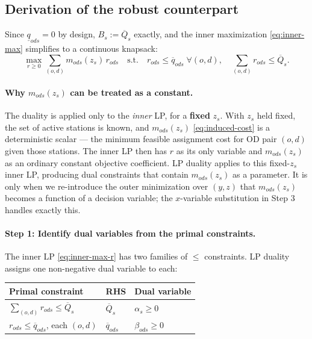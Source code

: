 \documentclass[11pt]{article}
\theoremstyle{definition}
\begin{document}
\subsection{Derivation of the robust counterpart}

Since $\underline{q}_{ods} = 0$ by design, $B_s := \overline{Q}_s$ exactly,
and the inner maximization \eqref{eq:inner-max} simplifies to a continuous
knapsack:
\begin{equation}
	\max_{r \ge 0}
	\sum_{(o,d)}
	m_{ods}(z_s)\, r_{ods}
	\quad
	\text{s.t.}\quad
	r_{ods} \le \overline{q}_{ods} \;\forall (o,d), \quad
	\sum_{(o,d)} r_{ods} \le \overline{Q}_s.
	\label{eq:inner-max-r}
\end{equation}

\paragraph{Why $m_{ods}(z_s)$ can be treated as a constant.}
The duality is applied only to the \emph{inner} LP, for a \textbf{fixed}
$z_s$.  With $z_s$ held fixed, the set of active stations is known, and
$m_{ods}(z_s)$ \eqref{eq:induced-cost} is a deterministic scalar --- the
minimum feasible assignment cost for OD pair $(o,d)$ given those stations.
The inner LP then has $r$ as its only variable and $m_{ods}(z_s)$ as an
ordinary constant objective coefficient.  LP duality applies to this
fixed-$z_s$ inner LP, producing dual constraints that contain $m_{ods}(z_s)$
as a parameter.  It is only when we re-introduce the outer minimization over
$(y,z)$ that $m_{ods}(z_s)$ becomes a function of a decision variable; the
$x$-variable substitution in Step 3 handles exactly this.

\paragraph{Step 1: Identify dual variables from the primal constraints.}
The inner LP \eqref{eq:inner-max-r} has two families of $\le$ constraints.
LP duality assigns one non-negative dual variable to each:
\begin{center}
	\renewcommand{\arraystretch}{1.4}
	\begin{tabular}{lll}
		\toprule
		Primal constraint & RHS                  & Dual variable       \\
		\midrule
		$\displaystyle\sum_{(o,d)} r_{ods} \le \overline{Q}_s$
		                  & $\overline{Q}_s$     & $\alpha_s \ge 0$    \\
		$r_{ods} \le \overline{q}_{ods}$, \quad each $(o,d)$
		                  & $\overline{q}_{ods}$ & $\beta_{ods} \ge 0$ \\
		\bottomrule
	\end{tabular}
\end{center}
\end{document}
